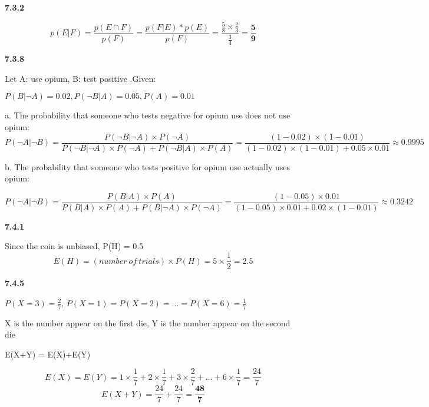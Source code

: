 \documentclass[12pt]{amsart}
\begin{document}
\textbf{7.3.2}

\[p(E|F)=\frac{p(E\cap F)}{p(F)}=\frac{p(F|E)*p(E)}{p(F)}=\frac{\frac{5}{8}\times\frac{2}{3}}{\frac{3}{4}}=\mathbf{\frac{5}{9}}\]

\textbf{7.3.8}

Let A: use opium, B: test positive .Given:

$P(B|\neg A) = 0.02, P(\neg B|A) = 0.05, P(A) = 0.01$

a. The probability that someone who tests negative
for opium use does not use opium: 
\[P(\neg A|\neg B)=\frac{P(\neg B|\neg A)\times P(\neg A)}{P(\neg B|\neg A)\times P(\neg A)+P(\neg B|A)\times P(A)}=\frac{(1-0.02)\times(1-0.01)}{(1-0.02)\times(1-0.01)+0.05\times0.01}\approx\mathbf{0.9995}\]

b. The probability that someone who tests positive
for opium use actually uses opium:

\[P(\neg A|\neg B)=\frac{P(B|A)\times P(A)}{P(B|A)\times P(A)+P(B|\neg A)\times P(\neg A)}=\frac{(1-0.05)\times0.01}{(1-0.05)\times0.01+0.02\times(1-0.01)}\approx\mathbf{0.3242}\]



\textbf{7.4.1}

Since the coin is unbiased, P(H) = 0.5
\[E(H)=(number\ of\ trials)\times P(H)=5\times\frac{1}{2}=\mathbf{2.5}\]

\textbf{7.4.5}

$P(X=3) =\frac{2}{7}$, $P(X=1)=P(X=2)=\dots=P(X=6)=\frac{1}{7}$ 

X is the number appear on the first die, Y is the number appear on the second die

E(X+Y) = E(X)+E(Y)

\[E(X)=E(Y)=1\times\frac{1}{7}+2\times\frac{1}{7}+3\times\frac{2}{7}+\dots+6\times\frac{1}{7}=\frac{24}{7}\]
\[E(X+Y)=\frac{24}{7}+\frac{24}{7}=\mathbf{\frac{48}{7}}\]
\end{document}
